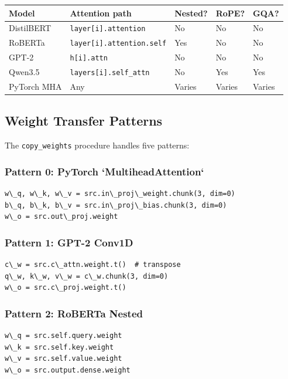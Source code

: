 \begin{table}[H]
\centering
\small
\begin{tabular}{lllll}
\toprule
\textbf{Model} & \textbf{Attention path} & \textbf{Nested?} & \textbf{RoPE?} & \textbf{GQA?} \\
\midrule
DistilBERT & \texttt{layer[i].attention} & No & No & No \\
RoBERTa & \texttt{layer[i].attention.self} & Yes & No & No \\
GPT-2 & \texttt{h[i].attn} & No & No & No \\
Qwen3.5 & \texttt{layers[i].self\_attn} & No & Yes & Yes \\
PyTorch MHA & Any & Varies & Varies & Varies \\
\bottomrule
\end{tabular}
\end{table}

\subsection{Weight Transfer Patterns}

The \texttt{copy\_weights} procedure handles five patterns:

\subsubsection{Pattern 0: PyTorch `MultiheadAttention`}

\begin{lstlisting}
w\_q, w\_k, w\_v = src.in\_proj\_weight.chunk(3, dim=0)
b\_q, b\_k, b\_v = src.in\_proj\_bias.chunk(3, dim=0)
w\_o = src.out\_proj.weight
\end{lstlisting}

\subsubsection{Pattern 1: GPT-2 Conv1D}

\begin{lstlisting}
c\_w = src.c\_attn.weight.t()  # transpose
q\_w, k\_w, v\_w = c\_w.chunk(3, dim=0)
w\_o = src.c\_proj.weight.t()
\end{lstlisting}

\subsubsection{Pattern 2: RoBERTa Nested}

\begin{lstlisting}
w\_q = src.self.query.weight
w\_k = src.self.key.weight
w\_v = src.self.value.weight
w\_o = src.output.dense.weight
\end{lstlisting}

